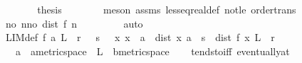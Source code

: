 \begin{isabellebody}
\ \ \ \ \isamarkupfalse%
\ \isamarkupfalse%
\ {\isacharquery}{\kern0pt}thesis\isanewline
\ \ \ \ \ \ \isamarkupfalse%
\ {\isacharparenleft}{\kern0pt}meson\ assms\ less{\isacharunderscore}{\kern0pt}eq{\isacharunderscore}{\kern0pt}real{\isacharunderscore}{\kern0pt}def\ not{\isacharunderscore}{\kern0pt}le\ order{\isacharunderscore}{\kern0pt}trans{\isacharparenright}{\kern0pt}\isanewline
\ \ \isamarkupfalse%
\isanewline
\ \ \isamarkupfalse%
\ \isamarkupfalse%
\ {\isachardoublequoteopen}{\isasymexists}no{\isachardot}{\kern0pt}\ {\isasymforall}n{\isasymge}no{\isachardot}{\kern0pt}\ dist\ {\isacharparenleft}{\kern0pt}f\ n{\isacharparenright}{\kern0pt}\ {}\ {\isacharless}{\kern0pt}\ {\isasymepsilon}{\isachardoublequoteclose}\isanewline
\ \ \ \ \isamarkupfalse%
\ auto\isanewline
{}\isamarkupfalse%
%
\endisatagproof
{\isafoldproof}%
%
\isadelimproof
%
\endisadelimproof
%
\isadelimdocument
%
\endisadelimdocument
%
\isatagdocument
%
\isamarkuptrue%
%
\endisatagdocument
{\isafolddocument}%
%
\isadelimdocument
%
\endisadelimdocument
{}\isamarkupfalse%
\ LIM{\isacharunderscore}{\kern0pt}def{\isacharcolon}{\kern0pt}\ {\isachardoublequoteopen}f\ {\isasymmidarrow}a{\isasymrightarrow}\ L\ {\isasymlongleftrightarrow}\ {\isacharparenleft}{\kern0pt}{\isasymforall}r\ {\isachargreater}{\kern0pt}\ {}{\isachardot}{\kern0pt}\ {\isasymexists}s\ {\isachargreater}{\kern0pt}\ {}{\isachardot}{\kern0pt}\ {\isasymforall}x{\isachardot}{\kern0pt}\ x\ {\isasymnoteq}\ a\ {\isasymand}\ dist\ x\ a\ {\isacharless}{\kern0pt}\ s\ {\isasymlongrightarrow}\ dist\ {\isacharparenleft}{\kern0pt}f\ x{\isacharparenright}{\kern0pt}\ L\ {\isacharless}{\kern0pt}\ r{\isacharparenright}{\kern0pt}{\isachardoublequoteclose}\isanewline
\ \ \ a\ {\isacharcolon}{\kern0pt}{\isacharcolon}{\kern0pt}\ {\isachardoublequoteopen}{\isacharprime}{\kern0pt}a{\isacharcolon}{\kern0pt}{\isacharcolon}{\kern0pt}metric{\isacharunderscore}{\kern0pt}space{\isachardoublequoteclose}\ \ L\ {\isacharcolon}{\kern0pt}{\isacharcolon}{\kern0pt}\ {\isachardoublequoteopen}{\isacharprime}{\kern0pt}b{\isacharcolon}{\kern0pt}{\isacharcolon}{\kern0pt}metric{\isacharunderscore}{\kern0pt}space{\isachardoublequoteclose}\isanewline
%
\isadelimproof
\ \ %
\endisadelimproof
%
\isatagproof
{}\isamarkupfalse%
\ tendsto{\isacharunderscore}{\kern0pt}iff\ eventually{\isacharunderscore}{\kern0pt}at\ \isamarkupfalse%

\end{isabellebody}
